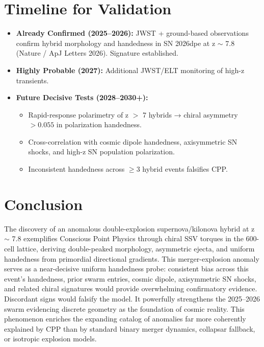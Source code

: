 \documentclass[11pt]{article}
\begin{document}
\section{Timeline for Validation}
\begin{itemize}
    \item \textbf{Already Confirmed (2025--2026):} JWST + ground-based observations confirm hybrid morphology and handedness in SN 2026dpe at z $\sim$ 7.8 (Nature / ApJ Letters 2026). Signature established.
    \item \textbf{Highly Probable (2027):} Additional JWST/ELT monitoring of high-z transients.
    \item \textbf{Future Decisive Tests (2028--2030+):}
    \begin{itemize}
        \item Rapid-response polarimetry of z $>$ 7 hybrids → chiral asymmetry $>0.055$ in polarization handedness.
        \item Cross-correlation with cosmic dipole handedness, axisymmetric SN shocks, and high-z SN population polarization.
        \item Inconsistent handedness across $\geq 3$ hybrid events falsifies CPP.
    \end{itemize}
\end{itemize}

\section{Conclusion}
The discovery of an anomalous double-explosion supernova/kilonova hybrid at z $\sim$ 7.8 exemplifies Conscious Point Physics through chiral SSV torques in the 600-cell lattice, deriving double-peaked morphology, asymmetric ejecta, and uniform handedness from primordial directional gradients.  
This merger-explosion anomaly serves as a near-decisive uniform handedness probe: consistent bias across this event's handedness, prior swarm entries, cosmic dipole, axisymmetric SN shocks, and related chiral signatures would provide overwhelming confirmatory evidence. Discordant signs would falsify the model. It powerfully strengthens the 2025--2026 swarm evidencing discrete geometry as the foundation of cosmic reality.  
This phenomenon enriches the expanding catalog of anomalies far more coherently explained by CPP than by standard binary merger dynamics, collapsar fallback, or isotropic explosion models.
\end{document}
